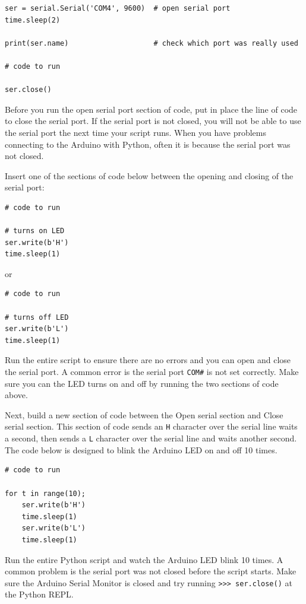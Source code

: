 \documentclass[11pt]{article}
\begin{document}
\begin{verbatim}
ser = serial.Serial('COM4', 9600)  # open serial port
time.sleep(2)

print(ser.name)                    # check which port was really used

# code to run          

ser.close() 
\end{verbatim}

Before you run the open serial port section of code, put in place the
line of code to close the serial port. If the serial port is not closed,
you will not be able to use the serial port the next time your script
runs. When you have problems connecting to the Arduino with Python,
often it is because the serial port was not closed.

Insert one of the sections of code below between the opening and closing
of the serial port:

\begin{verbatim}
# code to run 

# turns on LED
ser.write(b'H')
time.sleep(1)
\end{verbatim}

or

\begin{verbatim}
# code to run

# turns off LED
ser.write(b'L')
time.sleep(1)
\end{verbatim}

Run the entire script to ensure there are no errors and you can open and
close the serial port. A common error is the serial port
\texttt{\textquotesingle{}COM\#\textquotesingle{}} is not set correctly.
Make sure you can the LED turns on and off by running the two sections
of code above.

Next, build a new section of code between the Open serial section and
Close serial section. This section of code sends an
\texttt{\textquotesingle{}H\textquotesingle{}} character over the serial
line waits a second, then sends a
\texttt{\textquotesingle{}L\textquotesingle{}} character over the serial
line and waits another second. The code below is designed to blink the
Arduino LED on and off 10 times.

\begin{verbatim}
# code to run

for t in range(10);
    ser.write(b'H')
    time.sleep(1)
    ser.write(b'L')
    time.sleep(1)
\end{verbatim}

    Run the entire Python script and watch the Arduino LED blink 10 times. A
common problem is the serial port was not closed before the script
starts. Make sure the Arduino Serial Monitor is closed and try running
\texttt{\textgreater{}\textgreater{}\textgreater{}\ ser.close()} at the
Python REPL.
\end{document}
